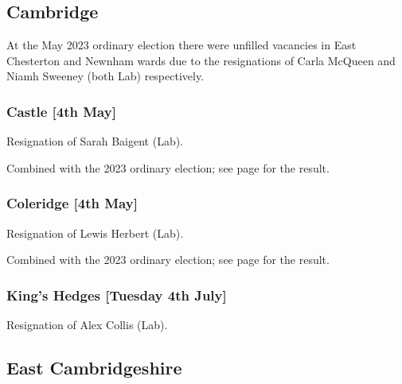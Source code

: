 \documentclass[a4paper,openany]{book}
\begin{document}
\begin{resultsiii}
\subsection*{Cambridge}

At the May 2023 ordinary election there were unfilled vacancies in East Chesterton and Newnham wards due to the resignations of Carla McQueen and Niamh Sweeney (both Lab) respectively.%
%

\subsubsection*{Castle \hspace*{\fill}\nolinebreak[1]%
	\enspace\hspace*{\fill}
	[4th May]}


Resignation of Sarah Baigent (Lab).

Combined with the 2023 ordinary election; see page \pageref{CastleCambridge} for the result.

\subsubsection*{Coleridge \hspace*{\fill}\nolinebreak[1]%
	\enspace\hspace*{\fill}
	[4th May]}


Resignation of Lewis Herbert (Lab).

Combined with the 2023 ordinary election; see page \pageref{ColeridgeCambridge} for the result.

\subsubsection*{King's Hedges \hspace*{\fill}\nolinebreak[1]%
	\enspace\hspace*{\fill}
	[Tuesday 4th July]}


Resignation of Alex Collis (Lab).

\subsection*{East Cambridgeshire}


\end{resultsiii}
\end{document}
